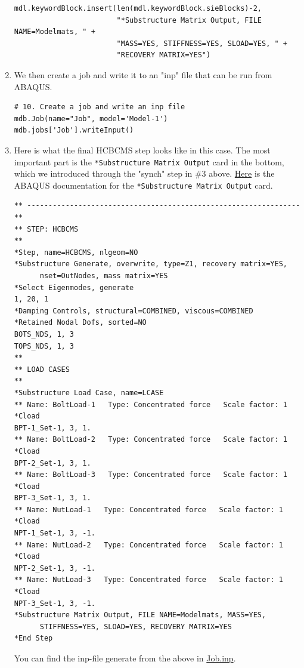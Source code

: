 \documentclass[11pt]{article}
\begin{document}
\begin{enumerate}
\begin{verbatim}
mdl.keywordBlock.insert(len(mdl.keywordBlock.sieBlocks)-2, 
                        "*Substructure Matrix Output, FILE NAME=Modelmats, " +
                        "MASS=YES, STIFFNESS=YES, SLOAD=YES, " +
                        "RECOVERY MATRIX=YES")
\end{verbatim}
\item We then create a job and write it to an "inp" file that can be run from ABAQUS.
\begin{verbatim}
# 10. Create a job and write an inp file
mdb.Job(name="Job", model='Model-1')
mdb.jobs['Job'].writeInput()
\end{verbatim}
\item Here is what the final HCBCMS step looks like in this case.
The most important part is the \texttt{*Substructure Matrix Output} card in the bottom,
which we introduced through the "synch" step in \#3 above.
\href{https://classes.engineering.wustl.edu/2009/spring/mase5513/abaqus/docs/v6.6/books/key/default.htm?startat=ch18abk43.html}{Here} is the ABAQUS documentation for the \texttt{*Substructure Matrix Output} card.
\begin{verbatim}
** ----------------------------------------------------------------
** 
** STEP: HCBCMS
** 
*Step, name=HCBCMS, nlgeom=NO
*Substructure Generate, overwrite, type=Z1, recovery matrix=YES,
      nset=OutNodes, mass matrix=YES
*Select Eigenmodes, generate
1, 20, 1
*Damping Controls, structural=COMBINED, viscous=COMBINED
*Retained Nodal Dofs, sorted=NO
BOTS_NDS, 1, 3
TOPS_NDS, 1, 3
** 
** LOAD CASES
** 
*Substructure Load Case, name=LCASE
** Name: BoltLoad-1   Type: Concentrated force   Scale factor: 1
*Cload
BPT-1_Set-1, 3, 1.
** Name: BoltLoad-2   Type: Concentrated force   Scale factor: 1
*Cload
BPT-2_Set-1, 3, 1.
** Name: BoltLoad-3   Type: Concentrated force   Scale factor: 1
*Cload
BPT-3_Set-1, 3, 1.
** Name: NutLoad-1   Type: Concentrated force   Scale factor: 1
*Cload
NPT-1_Set-1, 3, -1.
** Name: NutLoad-2   Type: Concentrated force   Scale factor: 1
*Cload
NPT-2_Set-1, 3, -1.
** Name: NutLoad-3   Type: Concentrated force   Scale factor: 1
*Cload
NPT-3_Set-1, 3, -1.
*Substructure Matrix Output, FILE NAME=Modelmats, MASS=YES,
      STIFFNESS=YES, SLOAD=YES, RECOVERY MATRIX=YES
*End Step
\end{verbatim}
You can find the inp-file generate from the above in \href{https://github.com/Nidish96/Abaqus4Joints/blob/main/assets/demo/Job.inp}{Job.inp}.
\end{enumerate}
\end{document}
